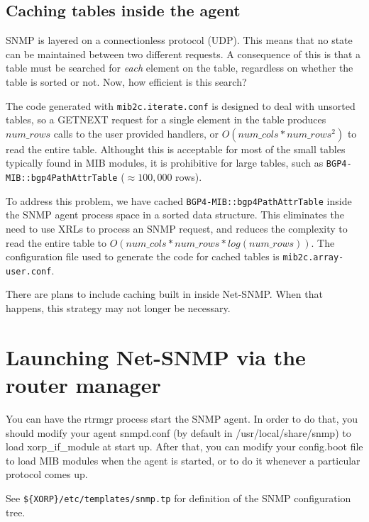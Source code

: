 \documentclass[11pt]{article}
\begin{document}
\subsection{Caching tables inside the agent}

SNMP is layered on a connectionless protocol (UDP).  This means that no state
can be maintained between two different requests.  A consequence of this is
that a table must be searched for \emph{each} element on the table,
regardless on whether the table is sorted or not.  Now, how efficient is this
search?

The code generated with \texttt{mib2c.iterate.conf} is designed to deal with
unsorted tables, so a GETNEXT request for a single element in the table
produces $num\_rows$ calls to the user provided handlers, or
$O(num\_cols*num\_rows^{2})$ to read the entire table.  Althought this is
acceptable for most of the small tables typically found in MIB modules, it is
prohibitive for large tables, such as \texttt{BGP4-MIB::bgp4PathAttrTable}
($\approx100,000$ rows).  

To address this problem, we have cached \texttt{BGP4-MIB::bgp4PathAttrTable} 
inside the SNMP agent process space in a sorted data structure.  This
eliminates the need to use XRLs to process an SNMP request, and reduces the
complexity to read the entire table to $O(num\_cols*num\_rows*log(num\_rows))$.
The configuration file used to generate the code for cached tables is
\texttt{mib2c.array-user.conf}.

There are plans to include caching built in inside Net-SNMP.  When that
happens, this strategy may not longer be necessary. 

\section{Launching Net-SNMP via the router manager}

You can have the rtrmgr process start the SNMP agent.  In order to do that, you
should modify your agent snmpd.conf (by default in /usr/local/share/snmp) to
load xorp\_if\_module at start up. After that, you can modify your config.boot
file to load MIB modules when the agent is started, or to do it whenever a
particular protocol comes up. 

See \texttt{\$\{XORP\}/etc/templates/snmp.tp} for definition of the SNMP
configuration tree.
\end{document}
